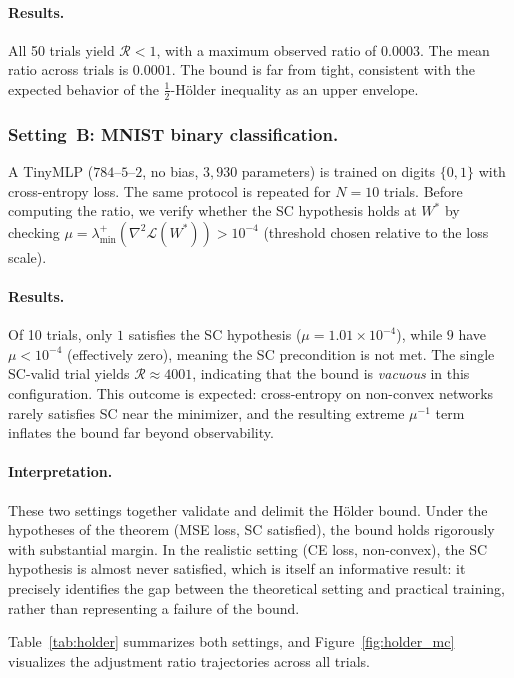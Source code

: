 \documentclass[a4paper,fleqn]{cas-sc}
\theoremstyle{remark}
\theoremstyle{definition}
\begin{document}
\paragraph{Results.}
All 50 trials yield $\mathcal{R}<1$, with a maximum observed ratio of $0.0003$. The mean ratio across trials is $0.0001$. The bound is far from tight, consistent with the expected behavior of the $\frac{1}{2}$-Hölder inequality as an upper envelope.

\subsubsection{Setting~B: MNIST binary classification.}
A TinyMLP ($784$--$5$--$2$, no bias, $3{,}930$ parameters) is trained on digits $\{0,1\}$ with cross-entropy loss. The same protocol is repeated for $N=10$ trials. Before computing the ratio, we verify whether the SC hypothesis holds at $W^*$ by checking $\mu=\lambda_{\min}^+(\nabla^2\mathcal{L}(W^*))>10^{-4}$ (threshold chosen relative to the loss scale).

\paragraph{Results.}
Of 10 trials, only $1$ satisfies the SC hypothesis ($\mu=1.01\times 10^{-4}$), while $9$ have $\mu<10^{-4}$ (effectively zero), meaning the SC precondition is not met. The single SC-valid trial yields $\mathcal{R}\approx 4001$, indicating that the bound is \emph{vacuous} in this configuration. This outcome is expected: cross-entropy on non-convex networks rarely satisfies SC near the minimizer, and the resulting extreme $\mu^{-1}$ term inflates the bound far beyond observability.

\paragraph{Interpretation.}
These two settings together validate and delimit the Hölder bound. Under the hypotheses of the theorem (MSE loss, SC satisfied), the bound holds rigorously with substantial margin. In the realistic setting (CE loss, non-convex), the SC hypothesis is almost never satisfied, which is itself an informative result: it precisely identifies the gap between the theoretical setting and practical training, rather than representing a failure of the bound.

Table~\ref{tab:holder} summarizes both settings, and Figure~\ref{fig:holder_mc} visualizes the adjustment ratio trajectories across all trials.
\end{document}
